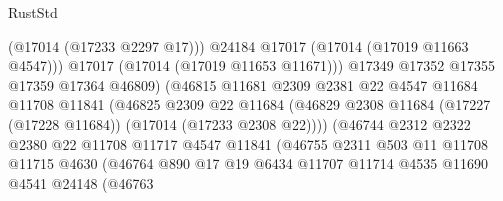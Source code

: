 \begin{lexlean}{RustStd}
\begin{coremodule}
                                        (@17014 (@17233 @2297 @17)))
                                      @24184
                                      @17017
                                      (@17014 (@17019 @11663 @4547)))
                                    @17017
                                    (@17014 (@17019 @11653 @11671)))
                                  @17349
                                  @17352
                                  @17355
                                  @17359
                                  @17364
                                  @46809)
                                (@46815
                                  @11681
                                  @2309
                                  @2381
                                  @22
                                  @4547
                                  @11684
                                  @11708
                                  @11841
                                  (@46825
                                    @2309
                                    @22
                                    @11684
                                    (@46829
                                      @2308
                                      @11684
                                      (@17227 (@17228 @11684))
                                      (@17014 (@17233 @2308 @22))))
                                  (@46744
                                    @2312
                                    @2322
                                    @2380
                                    @22
                                    @11708
                                    @11717
                                    @4547
                                    @11841
                                    (@46755
                                      @2311
                                      @503
                                      @11
                                      @11708
                                      @11715
                                      @4630
                                      (@46764
                                        @890
                                        @17
                                        @19
                                        @6434
                                        @11707
                                        @11714
                                        @4535
                                        @11690
                                        @4541
                                        @24148
                                        (@46763

\end{coremodule}
\end{lexlean}
